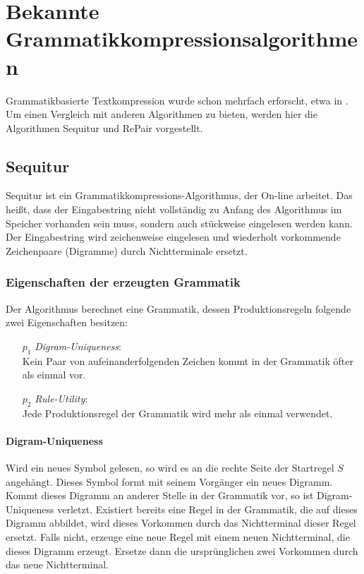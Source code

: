 \chapter{Bekannte Grammatikkompressionsalgorithmen}
\label{algorithmen}

Grammatikbasierte Textkompression wurde schon mehrfach erforscht, etwa in \cite{nevill-manning_identifying_1997, larsson_offline_1999, apostolico_off-line_2000}. Um einen Vergleich mit anderen Algorithmen zu bieten, werden hier die Algorithmen Sequitur \cite{nevill-manning_identifying_1997} und RePair \cite{larsson_offline_1999} vorgestellt.

\section{Sequitur}
\label{sequitur}

Sequitur \cite{nevill-manning_identifying_1997} ist ein Grammatikkompressions-Algorithmus, der On-line arbeitet. Das heißt, dass der Eingabestring nicht vollständig zu Anfang des Algorithmus im Speicher vorhanden sein muss, sondern auch stückweise eingelesen werden kann. Der Eingabestring wird zeichenweise eingelesen und wiederholt vorkommende Zeichenpaare (Digramme) durch Nichtterminale ersetzt.

\subsection{Eigenschaften der erzeugten Grammatik}

Der Algorithmus berechnet eine Grammatik, dessen Produktionsregeln folgende zwei Eigenschaften besitzen:
\begin{enumerate}
	\item[$p_1$] \emph{Digram-Uniqueness}:\\
	Kein Paar von aufeinanderfolgenden Zeichen kommt in der Grammatik öfter als einmal vor.
	\item[$p_2$] \emph{Rule-Utility}:\\
	Jede Produktionsregel der Grammatik wird mehr als einmal verwendet.
\end{enumerate}

\subsubsection{Digram-Uniqueness}

Wird ein neues Symbol gelesen, so wird es an die rechte Seite der Startregel $S$ angehängt. Dieses Symbol formt mit seinem Vorgänger ein neues Digramm. Kommt dieses Digramm an anderer Stelle in der Grammatik vor, so ist Digram-Uniqueness verletzt. 
Existiert bereits eine Regel in der Grammatik, die auf dieses Digramm abbildet, wird dieses Vorkommen durch das Nichtterminal dieser Regel ersetzt. 
Falls nicht, erzeuge eine neue Regel mit einem neuen Nichtterminal, die dieses Digramm erzeugt. Ersetze dann die ursprünglichen zwei Vorkommen durch das neue Nichtterminal.

